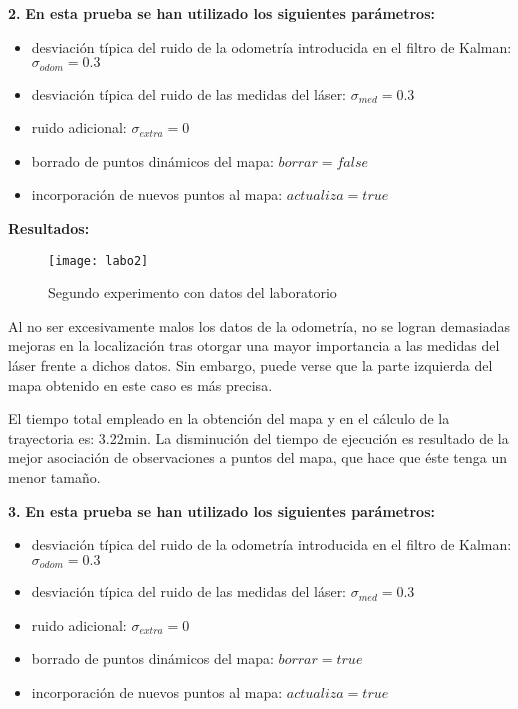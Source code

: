 \noindent
\textbf{2.} \textbf{En esta prueba se han utilizado los siguientes parámetros:}
\begin{itemize}
  \item desviación típica del ruido de la odometría introducida en el filtro de Kalman: $\sigma_{odom} = 0.3$
  \item desviación típica del ruido de las medidas del láser: $\sigma_{med} = 0.3$
  \item ruido adicional: $\sigma_{extra} = 0$
  \item borrado de puntos dinámicos del mapa: $borrar = false$
  \item incorporación de nuevos puntos al mapa: $actualiza = true$
\end{itemize}


\textbf{Resultados:}

\begin{figure}[h]
  \centering\texttt{[image: labo2]}\\
  \caption{Segundo experimento con datos del laboratorio}\label{fg:labo2}
\end{figure}

Al no ser excesivamente malos los datos de la odometría, no se logran demasiadas mejoras en la localización tras otorgar una mayor importancia a las medidas del láser frente a dichos datos. Sin embargo, puede verse que la parte izquierda del mapa obtenido en este caso es más precisa.

El tiempo total empleado en la obtención del mapa y en el cálculo de la trayectoria es: 3.22min. La disminución del tiempo de ejecución es resultado de la mejor asociación de observaciones a puntos del mapa, que hace que éste tenga un menor tamaño.

\noindent
\textbf{3.} \textbf{En esta prueba se han utilizado los siguientes parámetros:}
\begin{itemize}
  \item desviación típica del ruido de la odometría introducida en el filtro de Kalman: $\sigma_{odom} = 0.3$
  \item desviación típica del ruido de las medidas del láser: $\sigma_{med} = 0.3$
  \item ruido adicional: $\sigma_{extra} = 0$
  \item borrado de puntos dinámicos del mapa: $borrar = true$
  \item incorporación de nuevos puntos al mapa: $actualiza = true$
\end{itemize}


